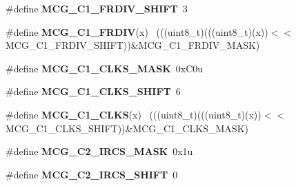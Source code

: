 \begin{DoxyCompactItemize}
\item 
\hypertarget{group___m_c_g___register___masks_gaee124d0ce81f6e815dbbcac62440708b}{}\#define {\bfseries M\+C\+G\+\_\+\+C1\+\_\+\+F\+R\+D\+I\+V\+\_\+\+S\+H\+I\+F\+T}~3\label{group___m_c_g___register___masks_gaee124d0ce81f6e815dbbcac62440708b}

\item 
\hypertarget{group___m_c_g___register___masks_gae985172a227b87028daa388a2d8f5c93}{}\#define {\bfseries M\+C\+G\+\_\+\+C1\+\_\+\+F\+R\+D\+I\+V}(x)                                                ~(((uint8\+\_\+t)(((uint8\+\_\+t)(x))$<$$<$M\+C\+G\+\_\+\+C1\+\_\+\+F\+R\+D\+I\+V\+\_\+\+S\+H\+I\+F\+T))\&M\+C\+G\+\_\+\+C1\+\_\+\+F\+R\+D\+I\+V\+\_\+\+M\+A\+S\+K)\label{group___m_c_g___register___masks_gae985172a227b87028daa388a2d8f5c93}

\item 
\hypertarget{group___m_c_g___register___masks_gae9a1db29d56ef219e4df3dc9d945b08e}{}\#define {\bfseries M\+C\+G\+\_\+\+C1\+\_\+\+C\+L\+K\+S\+\_\+\+M\+A\+S\+K}~0x\+C0u\label{group___m_c_g___register___masks_gae9a1db29d56ef219e4df3dc9d945b08e}

\item 
\hypertarget{group___m_c_g___register___masks_ga9ca1068f336097a94984ba4bba0798d6}{}\#define {\bfseries M\+C\+G\+\_\+\+C1\+\_\+\+C\+L\+K\+S\+\_\+\+S\+H\+I\+F\+T}~6\label{group___m_c_g___register___masks_ga9ca1068f336097a94984ba4bba0798d6}

\item 
\hypertarget{group___m_c_g___register___masks_ga0a02c1e393278df8c0f9fec88693df8f}{}\#define {\bfseries M\+C\+G\+\_\+\+C1\+\_\+\+C\+L\+K\+S}(x)                                                  ~(((uint8\+\_\+t)(((uint8\+\_\+t)(x))$<$$<$M\+C\+G\+\_\+\+C1\+\_\+\+C\+L\+K\+S\+\_\+\+S\+H\+I\+F\+T))\&M\+C\+G\+\_\+\+C1\+\_\+\+C\+L\+K\+S\+\_\+\+M\+A\+S\+K)\label{group___m_c_g___register___masks_ga0a02c1e393278df8c0f9fec88693df8f}

\item 
\hypertarget{group___m_c_g___register___masks_gaef3ef9fc35df3b7d404dd2b7279051cb}{}\#define {\bfseries M\+C\+G\+\_\+\+C2\+\_\+\+I\+R\+C\+S\+\_\+\+M\+A\+S\+K}~0x1u\label{group___m_c_g___register___masks_gaef3ef9fc35df3b7d404dd2b7279051cb}

\item 
\hypertarget{group___m_c_g___register___masks_ga9a364696151f81b7a671bafd25cf16d1}{}\#define {\bfseries M\+C\+G\+\_\+\+C2\+\_\+\+I\+R\+C\+S\+\_\+\+S\+H\+I\+F\+T}~0\label{group___m_c_g___register___masks_ga9a364696151f81b7a671bafd25cf16d1}


\end{DoxyCompactItemize}
